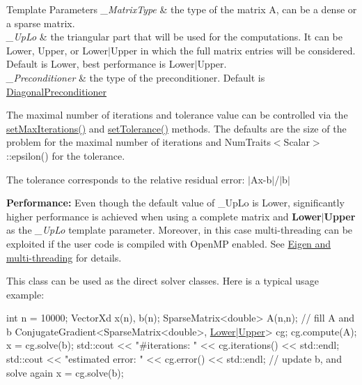\begin{DoxyTemplParams}{Template Parameters}
{\em \+\_\+\+Matrix\+Type} & the type of the matrix A, can be a dense or a sparse matrix. \\
\hline
{\em \+\_\+\+Up\+Lo} & the triangular part that will be used for the computations. It can be Lower, {\ttfamily Upper}, or {\ttfamily Lower$\vert$\+Upper} in which the full matrix entries will be considered. Default is {\ttfamily Lower}, best performance is {\ttfamily Lower$\vert$\+Upper}. \\
\hline
{\em \+\_\+\+Preconditioner} & the type of the preconditioner. Default is \hyperlink{group___iterative_linear_solvers___module_class_eigen_1_1_diagonal_preconditioner}{Diagonal\+Preconditioner}\\
\hline
\end{DoxyTemplParams}


The maximal number of iterations and tolerance value can be controlled via the \hyperlink{group___iterative_linear_solvers___module_af83de7a7d31d9d4bd1fef6222b07335b}{set\+Max\+Iterations()} and \hyperlink{group___iterative_linear_solvers___module_ac160a444af8998f93da9aa30e858470d}{set\+Tolerance()} methods. The defaults are the size of the problem for the maximal number of iterations and Num\+Traits$<$\+Scalar$>$\+::epsilon() for the tolerance.

The tolerance corresponds to the relative residual error\+: $\vert$\+Ax-\/b$\vert$/$\vert$b$\vert$

{\bfseries Performance\+:} Even though the default value of {\ttfamily \+\_\+\+Up\+Lo} is {\ttfamily Lower}, significantly higher performance is achieved when using a complete matrix and {\bfseries Lower$\vert$\+Upper} as the {\itshape \+\_\+\+Up\+Lo} template parameter. Moreover, in this case multi-\/threading can be exploited if the user code is compiled with Open\+MP enabled. See \hyperlink{TopicMultiThreading}{Eigen and multi-\/threading} for details.

This class can be used as the direct solver classes. Here is a typical usage example\+: 
\begin{DoxyCode}
\textcolor{keywordtype}{int} n = 10000;
VectorXd x(n), b(n);
SparseMatrix<double> A(n,n);
\textcolor{comment}{// fill A and b}
ConjugateGradient<SparseMatrix<double>, \hyperlink{group__enums_gga39e3366ff5554d731e7dc8bb642f83cda891792b8ed394f7607ab16dd716f60e6}{Lower}|\hyperlink{group__enums_gga39e3366ff5554d731e7dc8bb642f83cda6bcb58be3b8b8ec84859ce0c5ac0aaec}{Upper}> cg;
cg.compute(A);
x = cg.solve(b);
std::cout << \textcolor{stringliteral}{"#iterations:     "} << cg.iterations() << std::endl;
std::cout << \textcolor{stringliteral}{"estimated error: "} << cg.error()      << std::endl;
\textcolor{comment}{// update b, and solve again}
x = cg.solve(b);
\end{DoxyCode}


